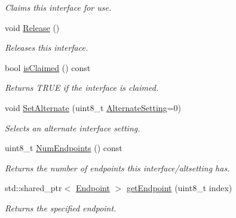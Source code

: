 \begin{DoxyCompactItemize}
\begin{DoxyCompactList}\small\item\em Claims this interface for use. \end{DoxyCompactList}\item 
\hypertarget{class_lib_u_s_b_1_1_interface_impl_a70b99c5ba75c199cf795d54bb425a6b0}{void \hyperlink{class_lib_u_s_b_1_1_interface_impl_a70b99c5ba75c199cf795d54bb425a6b0}{Release} ()}\label{class_lib_u_s_b_1_1_interface_impl_a70b99c5ba75c199cf795d54bb425a6b0}

\begin{DoxyCompactList}\small\item\em Releases this interface. \end{DoxyCompactList}\item 
\hypertarget{class_lib_u_s_b_1_1_interface_impl_a5bc5802fbdec9afc6b06ac1896aded0a}{bool \hyperlink{class_lib_u_s_b_1_1_interface_impl_a5bc5802fbdec9afc6b06ac1896aded0a}{is\-Claimed} () const }\label{class_lib_u_s_b_1_1_interface_impl_a5bc5802fbdec9afc6b06ac1896aded0a}

\begin{DoxyCompactList}\small\item\em Returns T\-R\-U\-E if the interface is claimed. \end{DoxyCompactList}\item 
void \hyperlink{class_lib_u_s_b_1_1_interface_impl_ad4ff414a8e5f576b4e03bad9a9c7f026}{Set\-Alternate} (uint8\-\_\-t \hyperlink{class_lib_u_s_b_1_1_interface_impl_a4a8737d90c753a33f3e14339c438a462}{Alternate\-Setting}=0)
\begin{DoxyCompactList}\small\item\em Selects an alternate interface setting. \end{DoxyCompactList}\item 
\hypertarget{class_lib_u_s_b_1_1_interface_impl_a860d06febe31d53c83e6634413ebc16f}{uint8\-\_\-t \hyperlink{class_lib_u_s_b_1_1_interface_impl_a860d06febe31d53c83e6634413ebc16f}{Num\-Endpoints} () const }\label{class_lib_u_s_b_1_1_interface_impl_a860d06febe31d53c83e6634413ebc16f}

\begin{DoxyCompactList}\small\item\em Returns the number of endpoints this interface/altsetting has. \end{DoxyCompactList}\item 
std\-::shared\-\_\-ptr$<$ \hyperlink{class_lib_u_s_b_1_1_endpoint}{Endpoint} $>$ \hyperlink{class_lib_u_s_b_1_1_interface_impl_a48711e334241d5cdc8264446ced1b880}{get\-Endpoint} (uint8\-\_\-t index)
\begin{DoxyCompactList}\small\item\em Returns the specified endpoint. \end{DoxyCompactList}\end{DoxyCompactItemize}
